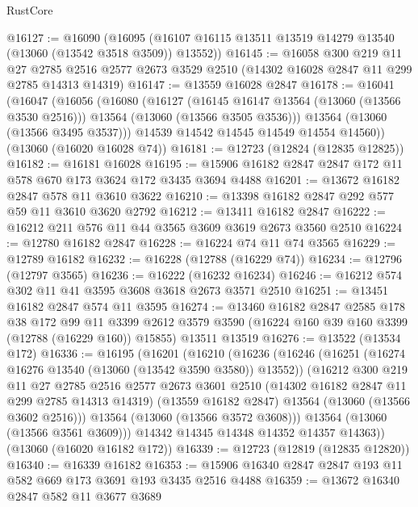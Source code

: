 \begin{lexlean}{RustCore}
\begin{coremodule}
@16127 := @16090
    (@16095 (@16107 @16115 @13511 @13519 @14279 @13540 (@13060 (@13542 @3518 @3509)) @13552))
@16145 := @16058
    @300
    @219
    @11
    @27
    @2785
    @2516
    @2577
    @2673
    @3529
    @2510
    (@14302 @16028 @2847 @11 @299 @2785 @14313 @14319)
@16147 := @13559 @16028 @2847
@16178 := @16041
    (@16047
      (@16056
        (@16080
          (@16127
            (@16145 @16147 @13564 (@13060 (@13566 @3530 @2516)))
            @13564
            (@13060 (@13566 @3505 @3536)))
          @13564
          (@13060 (@13566 @3495 @3537)))
        @14539
        @14542
        @14545
        @14549
        @14554
        @14560))
    (@13060 (@16020 @16028 @74))
@16181 := @12723 (@12824 (@12835 @12825))
@16182 := @16181 @16028
@16195 := @15906 @16182 @2847 @2847 @172 @11 @578 @670 @173 @3624 @172 @3435 @3694 @4488
@16201 := @13672 @16182 @2847 @578 @11 @3610 @3622
@16210 := @13398 @16182 @2847 @292 @577 @59 @11 @3610 @3620 @2792
@16212 := @13411 @16182 @2847
@16222 := @16212 @211 @576 @11 @44 @3565 @3609 @3619 @2673 @3560 @2510
@16224 := @12780 @16182 @2847
@16228 := @16224 @74 @11 @74 @3565
@16229 := @12789 @16182
@16232 := @16228 (@12788 (@16229 @74))
@16234 := @12796 (@12797 @3565)
@16236 := @16222 (@16232 @16234)
@16246 := @16212 @574 @302 @11 @41 @3595 @3608 @3618 @2673 @3571 @2510
@16251 := @13451 @16182 @2847 @574 @11 @3595
@16274 := @13460
    @16182
    @2847
    @2585
    @178
    @38
    @172
    @99
    @11
    @3399
    @2612
    @3579
    @3590
    (@16224 @160 @39 @160 @3399 (@12788 (@16229 @160)) @15855)
    @13511
    @13519
@16276 := @13522 (@13534 @172)
@16336 := @16195
    (@16201
      (@16210
        (@16236
          (@16246
            (@16251 (@16274 @16276 @13540 (@13060 (@13542 @3590 @3580)) @13552))
            (@16212
              @300
              @219
              @11
              @27
              @2785
              @2516
              @2577
              @2673
              @3601
              @2510
              (@14302 @16182 @2847 @11 @299 @2785 @14313 @14319)
              (@13559 @16182 @2847)
              @13564
              (@13060 (@13566 @3602 @2516)))
            @13564
            (@13060 (@13566 @3572 @3608)))
          @13564
          (@13060 (@13566 @3561 @3609)))
        @14342
        @14345
        @14348
        @14352
        @14357
        @14363))
    (@13060 (@16020 @16182 @172))
@16339 := @12723 (@12819 (@12835 @12820))
@16340 := @16339 @16182
@16353 := @15906 @16340 @2847 @2847 @193 @11 @582 @669 @173 @3691 @193 @3435 @2516 @4488
@16359 := @13672 @16340 @2847 @582 @11 @3677 @3689

\end{coremodule}
\end{lexlean}

